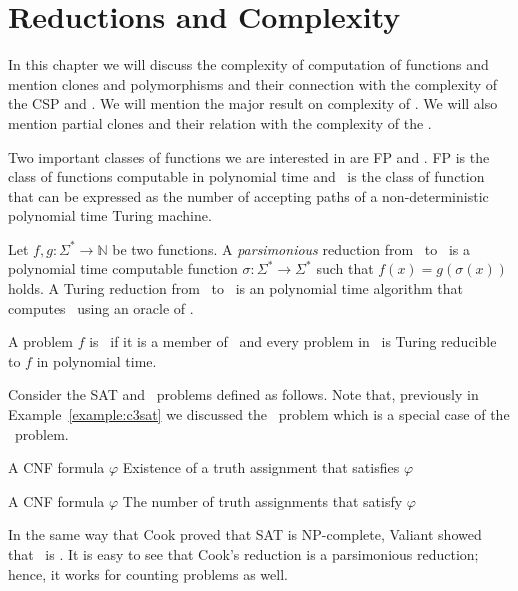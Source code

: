 \chapter{Reductions and Complexity}
In this chapter we will discuss the complexity of computation of functions
and mention clones and polymorphisms and their connection with 
the complexity of the CSP and \ccsp\@. We will mention the major result on complexity of 
\ccsp\@. We will also mention partial clones and
their relation with the complexity of the \ccsp\@.

Two important classes of functions we are interested in are FP and \cp\@.
FP is the class of functions computable in polynomial time and \cp\ is
the class of function that can be expressed as the
number of accepting paths of a non-deterministic polynomial time Turing machine. 

Let \(f,g:\Sigma^*\to\mathbb{N}\) be two functions. A \emph{parsimonious} reduction 
from \mf\ to \mg\ is a polynomial time computable function
\(\sigma:\Sigma^*\to\Sigma^*\) such that
\(f(x)=g(\sigma(x))\) holds. 
A Turing reduction from \mf\ to \mg\ is an polynomial time algorithm
that computes \mf\ using an oracle of \mg\@.

\begin{defi} 
A problem \(f\) is \cpc\ if it is a member of \cp\ and every problem in \cp\ is 
Turing reducible to \(f\) in polynomial time.
\end{defi}

Consider the SAT and \csat\ problems defined as follows.
Note that, previously in Example~\ref{example:c3sat} we discussed the \ctsat\ problem
which is a special case of the \csat\ problem.


{A CNF formula \(\varphi\)}
{Existence of a truth assignment that satisfies \(\varphi\)}

\pdef{\csat}
{A CNF formula \(\varphi\)}
{The number of truth assignments that satisfy \(\varphi\)}

In the same way that Cook \cite{cook1971} proved that SAT is NP-complete,
Valiant \cite{Valiant1979} showed that \csat\ is \cpc\@. It is easy to see that 
Cook's reduction is a parsimonious reduction; hence, it works for counting problems
as well. 

